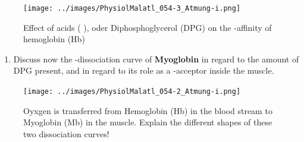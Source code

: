 		\begin{figure}[htp]
		  \texttt{[image: ../images/PhysiolMalatl\_054-3\_Atmung-i.png]}
		  \caption[Hb Rechtsverschiebung, aus Malatlas Physiol]{ Effect of acids ( ),   oder Diphosphoglycerol (DPG) on the  -affinity of hemoglobin (Hb) }
		 \label{fig:HbRechtsverschiebung}
		\end{figure}

\enlargethispage{2cm}
\begin{enumerate}[resume, leftmargin=*]
\item  Discuss now the  -dissociation curve of \textbf{Myoglobin} in regard to the amount of DPG present, and in regard to its role as a  -acceptor inside the muscle.

\end{enumerate}


		\begin{figure}[htp]
		  \texttt{[image: ../images/PhysiolMalatl\_054-2\_Atmung-i.png]}
		  \caption[Myoglobin vs Hämoglobin aus Malatlas Physiol]{ Oyxgen is transferred from Hemoglobin (Hb) in the blood stream to Myoglobin (Mb) in the muscle. Explain the different shapes of these two dissociation curves!}
		\label{fig:HbUebergabeMb}
		\end{figure}


%

